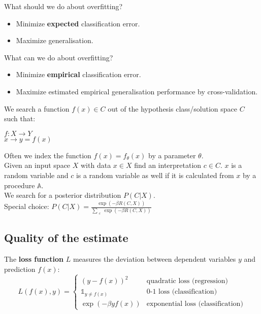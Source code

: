 \documentclass[twoside]{article}
\begin{document}
What should we do about overfitting?
\begin{itemize}
    \item Minimize \textbf{expected} classification error.
    \item Maximize generalisation.
\end{itemize}

What can we do about overfitting?
\begin{itemize}
    \item Minimize \textbf{empirical} classification error.
    \item Maximize estimated empirical generalisation performance by cross-validation.
\end{itemize}

We search a function $f(x) \in C$ out of the hypothesis class/solution space $C$ such that:
\begin{center}
$f : X \rightarrow Y$\\
$x \rightarrow y = f(x)$
\end{center}
Often we index the function $f(x) = f_\theta(x)$ by a parameter $\theta$.\\
Given an input space $X$ with data $x \in X$ find an interpretation $c \in C$. $x$ is a random variable and $c$ is a random variable as well if it is calculated from $x$ by a procedure $\mathbb{A}$.\\
We search for a posterior distribution $P(C | X)$.\\
Special choice: $P(C | X) = \frac{\exp{(-\beta R(C, X))}}{\sum\limits_{\substack{c}} \exp{(-\beta R(C, X))}} $ 

\subsection{Quality of the estimate}

The \textbf{loss function} $L$ measures the deviation between dependent variables $y$ and  prediction $f(x)$:
\begin{equation*}
  L(f(x),y) =
    \begin{cases}
      (y - f(x))^2 & \text{quadratic loss (regression)}\\
      \mathds{1}_{y \neq f(x)} & \text{0-1 loss (classification)}\\
      \exp{(-\beta y f(x))} & \text{exponential loss (classification)}
    \end{cases}       
\end{equation*}
\end{document}
